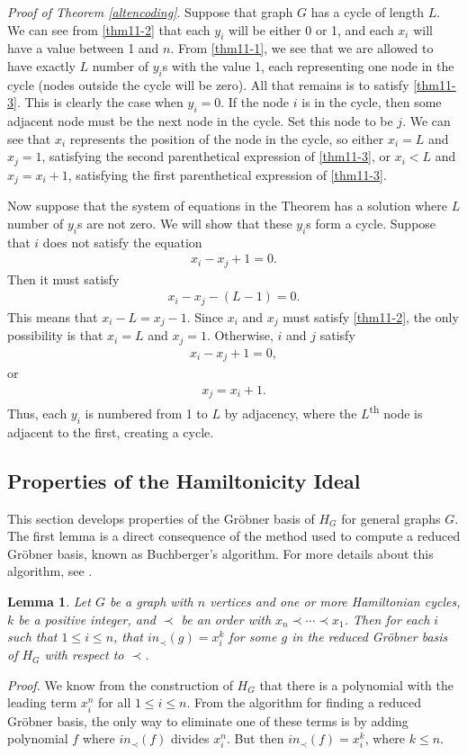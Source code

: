 \documentclass{amsart}
\renewcommand{\(}{\left(}
\renewcommand{\)}{\right)}
\newcommand{\<}{\langle}
\renewcommand{\>}{\rangle}
\newcommand{\aln}[1]{\begin{align*} #1 \end{align*}} %
\newtheorem{lemma}[theorem]{Lemma}
\theoremstyle{definition}
\theoremstyle{remark}
\begin{document}
\emph{Proof of Theorem \ref{altencoding}}. Suppose that graph $G$ has a cycle of length $L$. We can see from \eqref{thm11-2} that each $y_i$ will be either 0 or 1, and each $x_i$ will have a value between 1 and $n$. From \eqref{thm11-1}, we see that we are allowed to have exactly $L$ number of $y_i$s with the value 1, each representing one node in the cycle (nodes outside the cycle will be zero). All that remains is to satisfy \eqref{thm11-3}. This is clearly the case when $y_i = 0$. If the node $i$ is in the cycle, then some adjacent node must be the next node in the cycle. Set this node to be $j$. We can see that $x_i$ represents the position of the node in the cycle, so either $x_i = L$ and $x_j = 1$, satisfying the second parenthetical expression of \eqref{thm11-3}, or $x_i < L$ and $x_j = x_i+1$, satisfying the first parenthetical expression of \eqref{thm11-3}.

Now suppose that the system of equations in the Theorem has a solution where $L$ number of $y_i$s are not zero. We will show that these $y_i$s form a cycle. Suppose that $i$ does not satisfy the equation
\aln{
	x_i - x_j + 1 = 0.
}
Then it must satisfy
\aln{
	x_i - x_j - (L-1) = 0.
}
This means that $x_i - L = x_j - 1$. Since $x_i$ and $x_j$ must satisfy \eqref{thm11-2}, the only possibility is that $x_i = L$ and $x_j = 1$. Otherwise, $i$ and $j$ satisfy
\aln{
	x_i - x_j + 1 = 0,
}
or
\aln{
	x_j = x_i + 1.
}
Thus, each $y_i$ is numbered from 1 to $L$ by adjacency, where the $L$\textsuperscript{th} node is adjacent to the first, creating a cycle.


\subsection{Properties of the Hamiltonicity Ideal}

This section develops properties of the Gr\"obner basis of $H_G$ for general graphs $G$. The first lemma is a direct consequence of the method used to compute a reduced Gr\"obner basis, known as Buchberger's algorithm. For more details about this algorithm, see \cite{coxlittleoshea}.

\begin{lemma}
	Let $G$ be a graph with $n$ vertices and one or more Hamiltonian cycles, $k$ be a positive integer, and $\prec$ be an order with $x_n \prec \cdots \prec x_1$. Then  for each $i$ such that $1 \leq i \leq n$, that $in_\prec(g) = x_i^k$ for some $g$ in the reduced Gr\"obner basis of $H_G$ with respect to $\prec$.
\end{lemma}
\emph{Proof.} We know from the construction of $H_G$ that there is a polynomial with the leading term $x_i^n$ for all $1 \leq i \leq n$. From the algorithm for finding a reduced Gr\"obner basis, the only way to eliminate one of these terms is by adding polynomial $f$ where $in_\prec(f)$ divides $x_i^n$. But then $in_\prec(f) = x_i^k$, where $k \leq n$.
\end{document}
